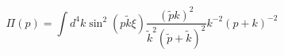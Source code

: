 \begin{equation}
\Pi(p)= \int d^4k \sin^2(p \tilde{k} \xi) 
\frac{(\tilde{p}k)^2}{\tilde{k}^2(\tilde{p}+\tilde{k})^2}
k^{-2}(p+k)^{-2}
\label{23e}
\end{equation}

